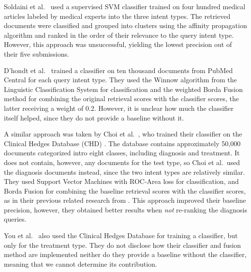 Soldaini et al.\ \cite{soldani} used a supervised SVM classifier trained on four hundred medical articles
labeled by medical experts into the three intent types. The retrieved documents were classified
and grouped into clusters using the affinity propagation algorithm and ranked in the order of their relevance
to the query intent type. However, this approach was unsuccessful, yielding the lowest precision out of their five submissions.

D’hondt et al.\ \cite{limsi2015} trained a classifier on ten thousand documents from PubMed Central
for each query intent type. They used the Winnow algorithm from the Linguistic Classification System
for classification and the weighted Borda Fusion method for combining the original retrieval scores
with the classifier scores, the latter receiving a weight of 0.2. However, it is
unclear how much the classifier itself helped, since they do not provide a baseline without it.

A similar approach was taken by Choi et al.\ \cite{choi},
who trained their classifier on the Clinical Hedges Database (CHD) \cite{chd}.
The database contains approximately 50,000 documents categorized
intro eight classes, including diagnosis and treatment.
It does not contain, however, any documents for the test type, so Choi et al.\ used the diagnosis documents instead,
since the two intent types are relatively similar.
They used Support Vector Machines with ROC-Area loss for classification,
and Borda Fusion for combining the baseline retrieval
scores with the classifier scores, as in their previous related research from \cite{choi-prev}.
This approach improved their baseline precision, however, they obtained better results when \emph{not} re-ranking the diagnosis queries.

You et al.\ \cite{FDUMedSearch} also used the Clinical Hedges Database for training a classifier, but only for the treatment type.
They do not disclose how their classifier and fusion method are implemented
neither do they provide a baseline without the classifier, meaning that we cannot determine its contribution.

